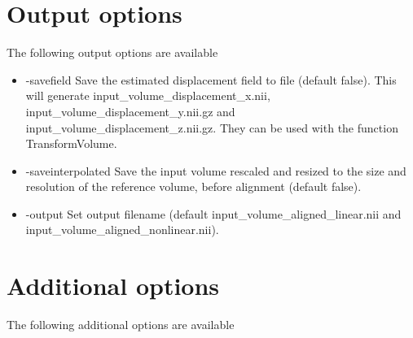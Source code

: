 \section{Output options}

The following output options are available

\begin{itemize}

\item -savefield                 
\newline \newline Save the estimated displacement field to file (default false). This will generate input\_volume\_displacement\_x.nii, input\_volume\_displacement\_y.nii.gz and input\_volume\_displacement\_z.nii.gz. They can be used with the function TransformVolume.

\item -saveinterpolated          
\newline \newline Save the input volume rescaled and resized to the size and resolution of the reference volume, before alignment (default false). 

\item -output 
\newline \newline Set output filename (default input\_volume\_aligned\_linear.nii and input\_volume\_aligned\_nonlinear.nii). 

\end{itemize}

\section{Additional options}

The following additional options are available

